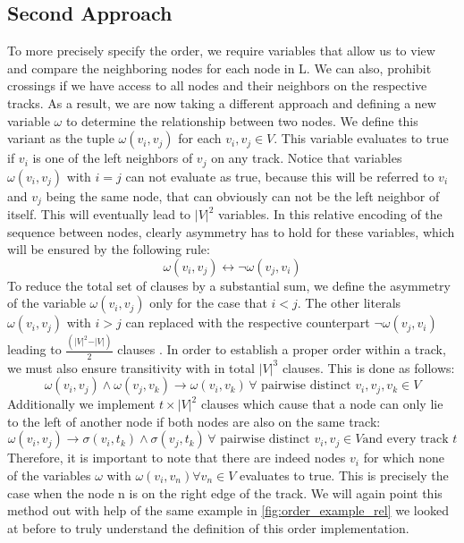 \documentclass[bachelor, english]{algothesis}
\begin{document}
\subsection{Second Approach}
To more precisely specify the order, we require variables that allow us to view and compare the neighboring nodes for each node in L. We can also, prohibit crossings if we have access to all nodes and their neighbors on the respective tracks. As a result, we are now taking a different approach and defining a new variable $\omega$ to determine the relationship between two nodes. We define this variant as the tuple $\omega(v_i,v_j)$ for each $v_i,v_j \in V$. This variable evaluates to true if $v_i$ is one of the left neighbors of $v_j$ on any track.  Notice that variables $\omega(v_i,v_j)$ with $i = j$ can not evaluate as true, because this will be referred to $v_i$ and $v_j$ being the same node, that can obviously can not be the left neighbor of itself. This will eventually lead to ${\vert V \vert}^2$ variables. In this relative encoding of the sequence between nodes, clearly asymmetry has to hold for these variables, which will be ensured by the following rule:
    $$ \omega(v_i,v_j) \leftrightarrow \lnot \omega(v_j,v_i) $$
To reduce the total set of clauses by a substantial sum, we define the asymmetry of the variable $\omega(v_i,v_j)$ only for the case that $i < j$. The other literals $\omega(v_i,v_j)$ with $i > j$ can replaced with the respective counterpart $\lnot \omega(v_j,v_i)$ leading to $\frac{(\vert V \vert^2-\vert V \vert)}{2}$ clauses \cite{asymmetric}. In order to establish a proper order within a track, we must also ensure transitivity with in total ${\vert V \vert}^3$ clauses. This is done as follows:
    $$ \omega(v_i,v_j) \land \omega(v_j,v_k) \rightarrow \omega(v_i,v_k) \, \forall \text{ pairwise distinct } v_i,v_j,v_k \in V$$
Additionally we implement $t \times {\vert V \vert}^2$ clauses which cause that a node can only lie to the left of another node if both nodes are also on the same track:
    $$ \omega(v_i,v_j) \rightarrow \sigma(v_i,t_k) \land \sigma(v_j,t_k) \, \forall \text{ pairwise distinct } v_i,v_j \in V \text{and every track }t$$
Therefore, it is important to note that there are indeed nodes $v_i$ for which none of the variables $\omega$ with $\omega(v_i,v_n) \forall v_n \in V$ evaluates to true. This is precisely the case when the node n is on the right edge of the track. We will again point  this method out with help of the same example in \cref{fig:order_example_rel} we looked at before to truly understand the definition of this order implementation.
\end{document}
